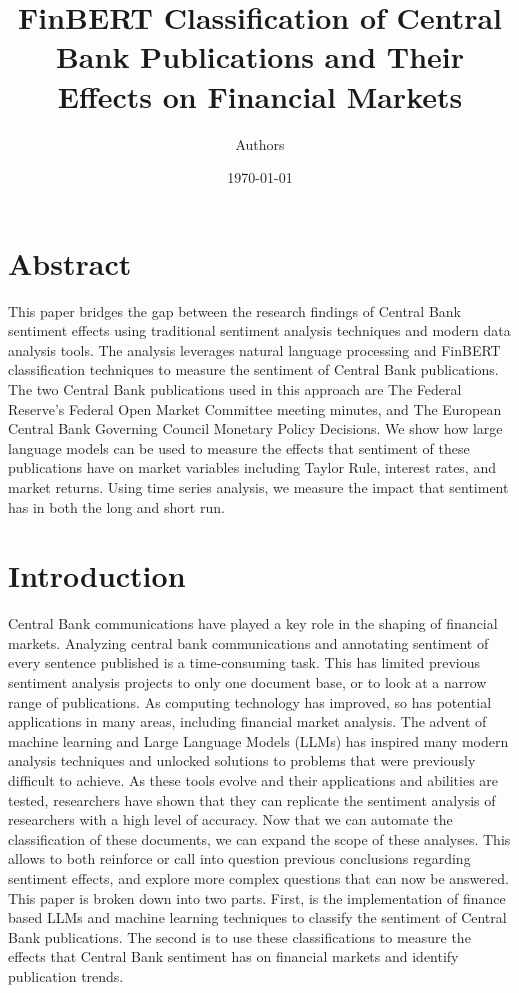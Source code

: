 \documentclass [12pt]{article}
\begin{document}
\title{FinBERT Classification of Central Bank Publications and Their Effects on Financial Markets}
\author{Authors}

\date{\today}

\maketitle

\section{Abstract}
This paper bridges the gap between the research findings of Central Bank sentiment effects using traditional sentiment analysis techniques and modern data analysis tools. The analysis leverages natural language processing and FinBERT classification techniques to measure the sentiment of Central Bank publications. The two Central Bank publications used in this approach are The Federal Reserve's Federal Open Market Committee meeting minutes, and The European Central Bank Governing Council Monetary Policy Decisions. We show how large language models can be used to measure the effects that sentiment of these publications have on market variables including Taylor Rule, interest rates, and market returns. Using time series analysis, we measure the impact that sentiment has in both the long and short run. 

\section{Introduction}
Central Bank communications have played a key role in the shaping of financial markets. Analyzing central bank communications and annotating sentiment of every sentence published is a time-consuming task. This has limited previous sentiment analysis projects to only one document base, or to look at a narrow range of publications. As computing technology has improved, so has potential applications in many areas, including financial market analysis. The advent of machine learning and Large Language Models (LLMs) has inspired many modern analysis techniques and unlocked solutions to problems that were previously difficult to achieve. As these tools evolve and their applications and abilities are tested, researchers have shown that they can replicate the sentiment analysis of researchers with a high level of accuracy. Now that we can automate the classification of these documents, we can expand the scope of these analyses. This allows to both reinforce or call into question previous conclusions regarding sentiment effects, and explore more complex questions that can now be answered.  This paper is broken down into two parts. First, is the implementation of finance based LLMs and machine learning techniques to classify the sentiment of Central Bank publications. The second is to use these classifications to measure the effects that Central Bank sentiment has on financial markets and identify publication trends. 
\end{document}
